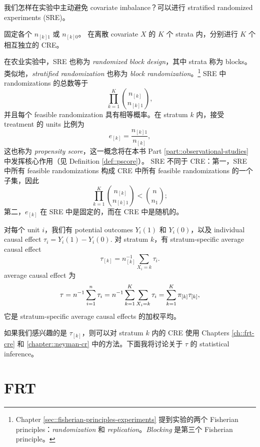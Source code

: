 我们怎样在实验中主动避免 covariate imbalance？可以进行 stratified randomized experiments (SRE)。

\begin{definition}[SRE]
\label{def::SRE}
固定各个 $n_{[k]1}$ 或 $n_{[k]0}$。
在离散 covariate $X$ 的 $K$ 个 strata 内，分别进行 $K$ 个相互独立的 CRE。
\end{definition}

在农业实验中，SRE 也称为 {\it randomized block design}，其中 strata 称为 blocks。类似地，{\it stratified randomization} 也称为 {\it block randomization}。\footnote{
Chapter \ref{sec::fisherian-principles-experiments} 提到实验的两个 Fisherian principles：{\it randomization} 和 {\it replication}。{\it Blocking} 是第三个 Fisherian principle。
} SRE 中 randomizations 的总数等于
$$
\prod_{k=1}^K  \binom{  n_{[k]} }{  n_{[k]1} } ,
$$
并且每个 feasible randomization 具有相等概率。在 stratum $k$ 内，接受 treatment 的 units 比例为
$$
e_{[k]} = \frac{n_{[k]1}}{n_{[k]}},
$$
这也称为 {\it propensity score}，这一概念将在本书 Part \ref{part::observational-studies} 中发挥核心作用（见 Definition \ref{def::pscore}）。
SRE 不同于 CRE：第一，SRE 中所有 feasible randomizations 构成 CRE 中所有 feasible randomizations 的一个子集，因此
$$
\prod_{k=1}^K  \binom{  n_{[k]} }{  n_{[k]1} } < 
\binom{n}{n_1} ;
$$
第二，$e_{[k]} $ 在 SRE 中是固定的，而在 CRE 中是随机的。


对每个 unit $i$，我们有 potential outcomes $Y_i(1)$ 和 $Y_i(0)$，以及 individual causal effect $\tau_i = Y_i(1) - Y_i(0) . $
对 stratum $k$，有 stratum-specific average causal effect
$$
\tau_{[k]} = n_{[k]}^{-1} \sum_{X_i   = k} \tau_i .
$$
average causal effect 为
$$
\tau = n^{-1} \sum_{i=1}^n \tau_i = n^{-1} \sum_{k=1}^K \sum_{X_i   = k} \tau_i =  \sum_{k=1}^K  \pi_{[k]}  \tau_{[k]},
$$
它是 stratum-specific average causal effects 的加权平均。


如果我们感兴趣的是 $\tau_{[k]} $，则可以对 stratum $k$ 内的 CRE 使用 Chapters \ref{ch::frt-cre} 和 \ref{chapter::neyman-cr} 中的方法。下面我将讨论关于 $\tau$ 的 statistical inference。


\section{FRT}
\label{sec::sre-frt}


